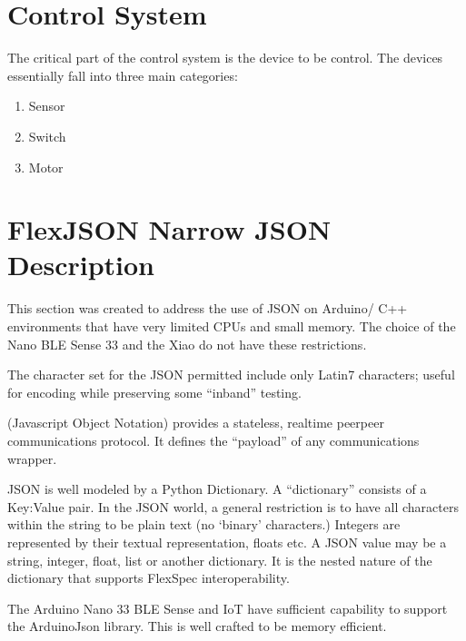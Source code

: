 \documentclass[letterpaper,10pt,english,openany,oneside]{sphinxmanual}
\begin{document}
\section{Control System}
\label{\detokenize{controls:control-system}}\label{\detokenize{controls:fs1-control}}
\sphinxAtStartPar
The critical part of the control system is the device to be control.
The devices essentially fall into three main categories:
\begin{enumerate}
%
\item {} 
\sphinxAtStartPar
Sensor

\item {} 
\sphinxAtStartPar
Switch

\item {} 
\sphinxAtStartPar
Motor

\end{enumerate}


\section{FlexJSON \textendash{} Narrow JSON Description}
\label{\detokenize{controls:flexjson-narrow-json-description}}\label{\detokenize{controls:flexjson}}
\sphinxAtStartPar
This section was created to address the use of JSON on Arduino/
C++ environments that have very limited CPUs and small memory.
The choice of the Nano BLE Sense 33 and the Xiao do not have
these restrictions.

\sphinxAtStartPar
The character set for the JSON permitted include only
Latin\sphinxhyphen{}7 characters; useful for encoding while preserving
some “in\sphinxhyphen{}band” testing.

\sphinxAtStartPar
{} (Javascript Object
Notation) provides a stateless, real\sphinxhyphen{}time peer\sphinxhyphen{}peer communications
protocol. It defines the “payload” of any communications wrapper.

\sphinxAtStartPar
JSON is well modeled by a Python Dictionary. A “dictionary” consists
of a Key:Value pair.  In the JSON world, a general restriction is to
have all characters within the string to be plain text (no ‘binary’
characters.) Integers are represented by their textual representation,
floats etc.  A JSON value may be a string, integer, float, list or
another dictionary.  It is the nested nature of the dictionary that
supports FlexSpec interoperability.

\sphinxAtStartPar
The Arduino Nano 33 BLE Sense and IoT have sufficient capability
to support the ArduinoJson library. This is well crafted to be
memory efficient.
\end{document}
